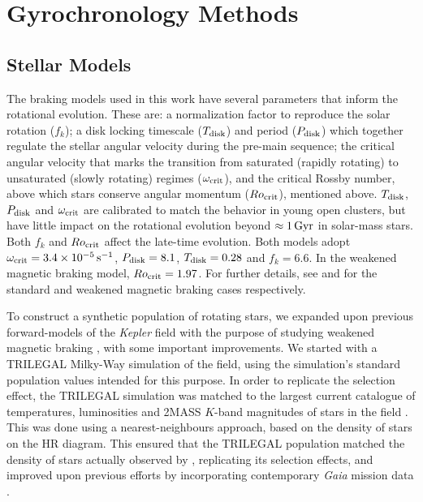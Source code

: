 \section{Gyrochronology Methods}\label{s:gyro}
\subsection{Stellar Models}\label{ssec:models}
The braking models used in this work have several parameters that inform the rotational evolution. These are: a normalization factor to reproduce the solar rotation ($f_k$); a disk locking timescale ($T_{\rm disk}$) and period ($P_{\rm disk}$) which together regulate the stellar angular velocity during the pre-main sequence; the critical angular velocity that marks the transition from saturated (rapidly rotating) to unsaturated (slowly rotating) regimes ($\omega_{\rm crit}$), and the critical Rossby number, above which stars conserve angular momentum ($Ro_{\rm crit}$), mentioned above. $T_{\rm disk}$, $P_{\rm disk}$ and $\omega_{\rm crit}$ are calibrated to match the behavior in young open clusters, but have little impact on the rotational evolution beyond $\approx 1\, \rm{Gyr}$ in solar-mass stars. Both $f_k$ and $Ro_{\rm crit}$ affect the late-time evolution. Both models adopt $\omega_{\rm crit} = 3.4  \times 10^{-5}\, \rm{s}^{-1}$, $P_{\rm disk} = 8.1$, $T_{\rm disk} = 0.28$ and $f_k = 6.6$. In the weakened magnetic braking model, $Ro_{\rm crit} = 1.97$. For further details, see \cite{m_vansaders+pinsonneault2013} and \cite{m_vansaders+2016, m_vansaders+2019} for the standard and weakened magnetic braking cases respectively.

To construct a synthetic population of rotating stars, we expanded upon previous forward-models of the \textit{Kepler} field with the purpose of studying weakened magnetic braking \cite{m_vansaders+2019}, with some important improvements. We started with a TRILEGAL \cite{m_girardi+2012} Milky-Way simulation of the \kepler field, using the simulation's standard population values intended for this purpose. In order to replicate the \kepler selection effect, the TRILEGAL simulation was matched to the largest current catalogue of temperatures, luminosities and 2MASS $K$-band magnitudes of stars in the \kepler field \cite{m_berger+2020}. This was done using a nearest-neighbours approach, based on the density of stars on the HR diagram. This ensured that the TRILEGAL population matched the density of stars actually observed by \kepler, replicating its selection effects, and improved upon previous efforts \cite{m_vansaders+2019} by incorporating contemporary \textit{Gaia} mission data \cite{m_gaiacollaboration+2018}.


